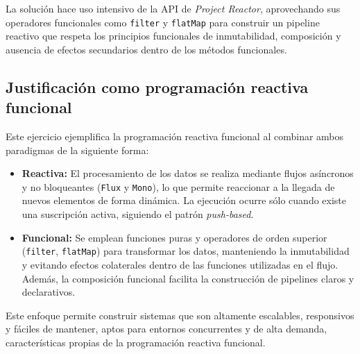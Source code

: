 La solución hace uso intensivo de la API de \textit{Project Reactor}, aprovechando sus operadores funcionales como \texttt{filter} y \texttt{flatMap} para construir un pipeline reactivo que respeta los principios funcionales de inmutabilidad, composición y ausencia de efectos secundarios dentro de los métodos funcionales.

\subsection{Justificación como programación reactiva funcional}

Este ejercicio ejemplifica la programación reactiva funcional al combinar ambos paradigmas de la siguiente forma:

\begin{itemize}
    \item \textbf{Reactiva:} El procesamiento de los datos se realiza mediante flujos asíncronos y no bloqueantes (\texttt{Flux} y \texttt{Mono}), lo que permite reaccionar a la llegada de nuevos elementos de forma dinámica. La ejecución ocurre sólo cuando existe una suscripción activa, siguiendo el patrón \textit{push-based}.
    \item \textbf{Funcional:} Se emplean funciones puras y operadores de orden superior (\texttt{filter}, \texttt{flatMap}) para transformar los datos, manteniendo la inmutabilidad y evitando efectos colaterales dentro de las funciones utilizadas en el flujo. Además, la composición funcional facilita la construcción de pipelines claros y declarativos.
\end{itemize}

Este enfoque permite construir sistemas que son altamente escalables, responsivos y fáciles de mantener, aptos para entornos concurrentes y de alta demanda, características propias de la programación reactiva funcional.
